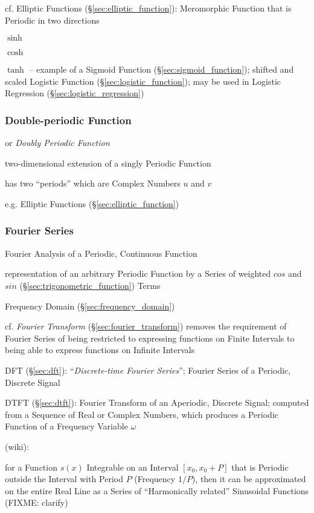cf. Elliptic Functions (\S\ref{sec:elliptic_function}): Meromorphic Function
that is Periodic in two directions

$\sinh$

$\cosh$

$\tanh$ -- example of a Sigmoid Function (\S\ref{sec:sigmoid_function}); shifted
and scaled Logistic Function (\S\ref{sec:logistic_function}); may be used in
Logistic Regression (\S\ref{sec:logistic_regression})



\subsubsection{Double-periodic Function}\label{sec:double_periodic}

or \emph{Doubly Periodic Function}

two-dimensional extension of a singly Periodic Function

has two ``periods'' which are Complex Numbers $u$ and $v$

e.g. Elliptic Functions (\S\ref{sec:elliptic_function})



\subsubsection{Fourier Series}\label{sec:fourier_series}

Fourier Analysis of a Periodic, Continuous Function

representation of an arbitrary Periodic Function by a Series of weighted $cos$
and $sin$ (\S\ref{sec:trigonometric_function}) Terms

\fist Frequency Domain (\S\ref{sec:frequency_domain})

\fist cf. \emph{Fourier Transform} (\S\ref{sec:fourier_transform}) removes the
requirement of Fourier Series of being restricted to expressing functions on
Finite Intervals to being able to express functions on Infinite Intervals

DFT (\S\ref{sec:dft}): ``\emph{Discrete-time Fourier Series}''; Fourier Series
of a Periodic, Discrete Signal

DTFT (\S\ref{sec:dtft}): Fourier Transform of an Aperiodic, Discrete Signal;
computed from a Sequence of Real or Complex Numbers, which produces a Periodic
Function of a Frequency Variable $\omega$


(wiki):

for a Function $s(x)$ Integrable on an Interval $[x_0,x_0 + P]$ that is
Periodic outside the Interval with Period $P$ (Frequency $1/P$), then it can be
approximated on the entire Real Line as a Series of ``Harmonically related''
Sinusoidal Functions (FIXME: clarify)

